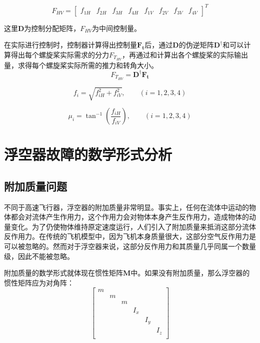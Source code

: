 \begin{equation}
    F_{HV} = \left[\begin{matrix}f_{1H}&f_{2H}&f_{3H}&f_{4H}&f_{1V}&f_{2V}&f_{3V}&f_{4V}\end{matrix}
\right]^T
\end{equation}

这里$\mathbf{D}$为控制分配矩阵，$F_{HV}$为中间控制量。

在实际进行控制时，控制器计算得出控制量$\mathbf{F_t}$后，通过$\mathbf{D}$的伪逆矩阵$\mathbf{D}^{\dagger}$和可以计算得出每个螺旋桨实际需求的分力$F_{T_{HV}}$，再通过和计算出各个螺旋桨的实际输出量，求得每个螺旋桨实际所需的推力和转角大小。
\begin{equation}\label{eq:fthv}
    F_{T_{HV}} = \mathbf{D}^{\dagger}\mathbf{F_t}
\end{equation}

\begin{equation}\label{eq:fi}
    f_i = \sqrt{f_{iH}^2+f_{iV}^2}, \qquad (i=1,2,3,4)
\end{equation}

\begin{equation}\label{eq:miui}
    \mu_i = \tan^{-1}\left(\frac{f_{iH}}{f_{iV}}\right), \qquad (i=1,2,3,4)
\end{equation}

\section{浮空器故障的数学形式分析}
\subsection{附加质量问题}
不同于高速飞行器，浮空器的附加质量非常明显。事实上，任何在流体中运动的物体都会对流体产生作用力，这个作用力会对物体本身产生反作用力，造成物体的动量变化\cite{mueller2004development}。为了仍使物体维持原定速度运行，人们引入了附加质量来抵消这部分流体反作用力。在传统的飞机模型中，因为飞机本身质量很大，这部分空气反作用力是可以被忽略的。然而对于浮空器来说，这部分反作用力和其质量几乎同属一个数量级，因此不能被忽略。

附加质量的数学形式就体现在惯性矩阵$\mathbf{M}$中。如果没有附加质量，那么浮空器的惯性矩阵应为对角阵：
\begin{equation}
    \left[\begin{matrix}
    m&&&&&\\
    &m&&&&\\
    &&m&&&\\
    &&&I_x&&\\
    &&&&I_y&\\
    &&&&&I_z\\
    \end{matrix}\right]
\end{equation}

